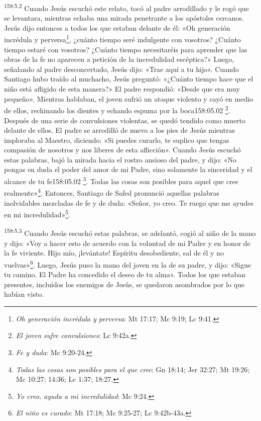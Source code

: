 {\par 
\textsuperscript{158:5.2} Cuando Jesús escuchó este relato, tocó al padre arrodillado y le rogó que se levantara, mientras echaba una mirada penetrante a los apóstoles cercanos. Jesús dijo entonces a todos los que estaban delante de él: «Oh generación incrédula y perversa\footnote{\textit{Oh generación incrédula y perversa}: Mt 17:17; Mc 9:19; Lc 9:41.}, ¿cuánto tiempo seré indulgente con vosotros? ¿Cuánto tiempo estaré con vosotros? ¿Cuánto tiempo necesitaréis para aprender que las obras de la fe no aparecen a petición de la incredulidad escéptica?» Luego, señalando al padre desconcertado, Jesús dijo: «Trae aquí a tu hijo». Cuando Santiago hubo traído al muchacho, Jesús preguntó: «¿Cuánto tiempo hace que el niño está afligido de esta manera?» El padre respondió: «Desde que era muy pequeño». Mientras hablaban, el joven sufrió un ataque violento y cayó en medio de ellos, rechinando los dientes y echando espuma por la boca158:05.02 \footnote{\textit{El joven sufre convulsiones}: Lc 9:42a.}. Después de una serie de convulsiones violentas, se quedó tendido como muerto delante de ellos. El padre se arrodilló de nuevo a los pies de Jesús mientras imploraba al Maestro, diciendo: «Si puedes curarlo, te suplico que tengas compasión de nosotros y nos liberes de esta aflicción». Cuando Jesús escuchó estas palabras, bajó la mirada hacia el rostro ansioso del padre, y dijo: «No pongas en duda el poder del amor de mi Padre, sino solamente la sinceridad y el alcance de tu fe158:05.02 \footnote{\textit{Fe y duda}: Mc 9:20-24.}. Todas las cosas son posibles para aquel que cree realmente»\footnote{\textit{Todas las cosas son posibles para el que cree}: Gn 18:14; Jer 32:27; Mt 19:26; Mc 10:27; 14:36; Lc 1:37; 18:27.}. Entonces, Santiago de Safed pronunció aquellas palabras inolvidables mezcladas de fe y de duda: «Señor, yo creo. Te ruego que me ayudes en mi incredulidad»\footnote{\textit{Yo creo, ayuda a mi incredulidad}: Mc 9:24.}.

\par 
\textsuperscript{158:5.3} Cuando Jesús escuchó estas palabras, se adelantó, cogió al niño de la mano y dijo: «Voy a hacer esto de acuerdo con la voluntad de mi Padre y en honor de la fe viviente. Hijo mío, ¡levántate! Espíritu desobediente, sal de él y no vuelvas»\footnote{\textit{El niño es curado}: Mt 17:18; Mc 9:25-27; Lc 9:42b-43a.}. Luego, Jesús puso la mano del joven en la de su padre, y dijo: «Sigue tu camino. El Padre ha concedido el deseo de tu alma». Todos los que estaban presentes, incluídos los enemigos de Jesús, se quedaron asombrados por lo que habían visto.

}
